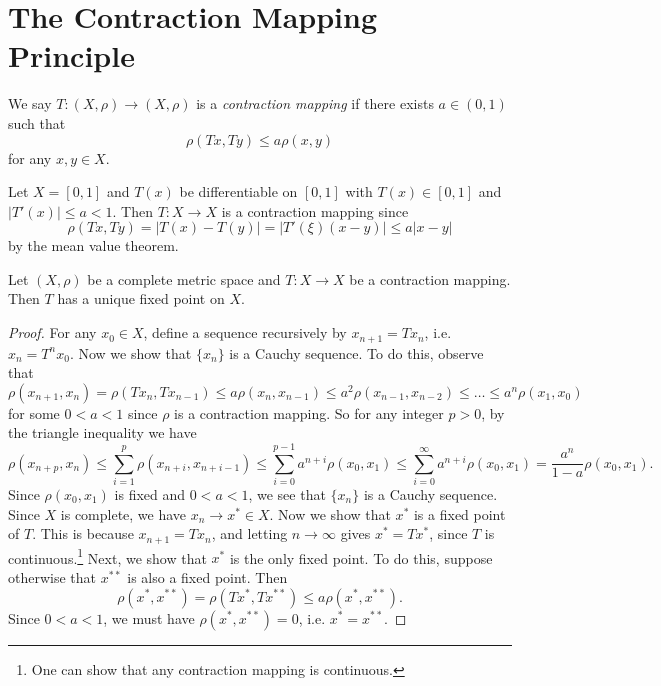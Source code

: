 \section{The Contraction Mapping Principle}
\begin{definition}
  We say $T : (X, \rho) \to (X, \rho)$ is a
  \emph{contraction mapping} if there exists
  $a \in (0, 1)$ such that
  \[
    \rho(Tx, Ty) \le a \rho(x, y)
  \]
  for any $x, y \in X$.
\end{definition}

\begin{example}
  Let $X = [0, 1]$ and $T(x)$ be differentiable on
  $[0, 1]$ with $T(x) \in [0, 1]$ and $|T'(x)| \le a < 1$.
  Then $T : X \to X$ is a contraction mapping since
  \[
    \rho(Tx, Ty) = |T(x) - T(y)|
    = |T'(\xi)(x - y)| \le a|x - y|
  \]
  by the mean value theorem.
\end{example}

\begin{theorem}
  Let $(X, \rho)$ be a complete metric space
  and $T : X \to X$ be a contraction mapping. Then
  $T$ has a unique fixed point on $X$.
\end{theorem}

\begin{proof}
  For any $x_0 \in X$, define a sequence recursively
  by $x_{n + 1} = Tx_n$, i.e. $x_n = T^n x_0$. Now we
  show that $\{x_n\}$ is a Cauchy sequence. To do this,
  observe that
  \[
    \rho(x_{n + 1}, x_n)
    = \rho(Tx_n, Tx_{n - 1})
    \le a \rho(x_n, x_{n - 1})
    \le a^2 \rho(x_{n - 1}, x_{n - 2})
    \le \dots
    \le a^n \rho(x_1, x_0)
  \]
  for some $0 < a < 1$ since $\rho$ is a contraction
  mapping.
  So for any integer $p > 0$, by the triangle
  inequality we have
  \[
    \rho(x_{n + p}, x_n) \le
    \sum_{i = 1}^p \rho(x_{n + i}, x_{n + i - 1})
    \le \sum_{i = 0}^{p - 1} a^{n + i} \rho(x_0, x_1)
    \le \sum_{i = 0}^\infty a^{n + i} \rho(x_0, x_1)
    = \frac{a^n}{1 - a} \rho(x_0, x_1).
  \]
  Since $\rho(x_0, x_1)$ is fixed and $0 < a < 1$, we
  see that $\{x_n\}$ is a Cauchy sequence. Since
  $X$ is complete, we have $x_n \to x^* \in X$. Now
  we show that $x^*$ is a fixed point of $T$. This is
  because $x_{n + 1} = Tx_n$, and letting $n \to \infty$
  gives $x^* = Tx^*$, since $T$ is continuous.\footnote{One can show that any contraction mapping is continuous.}
  Next, we show that $x^*$ is the only fixed point.
  To do this, suppose otherwise that
  $x^{**}$ is also a fixed point. Then
  \[
    \rho(x^*, x^{**}) = \rho(Tx^*, Tx^{**})
    \le a \rho(x^*, x^{**}).
  \]
  Since $0 < a < 1$, we must have $\rho(x^*, x^{**}) = 0$,
  i.e. $x^* = x^{**}$.
\end{proof}

